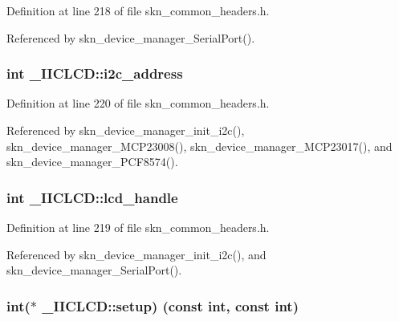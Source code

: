 Definition at line 218 of file skn\+\_\+common\+\_\+headers.\+h.



Referenced by skn\+\_\+device\+\_\+manager\+\_\+\+Serial\+Port().

\hypertarget{struct___i_i_c_l_c_d_a3f3fe8757875939b987ac0c416081551}{}
\subsubsection[{i2c\+\_\+address}]{\setlength{\rightskip}{0pt plus 5cm}int \+\_\+\+I\+I\+C\+L\+C\+D\+::i2c\+\_\+address}\label{struct___i_i_c_l_c_d_a3f3fe8757875939b987ac0c416081551}


Definition at line 220 of file skn\+\_\+common\+\_\+headers.\+h.



Referenced by skn\+\_\+device\+\_\+manager\+\_\+init\+\_\+i2c(), skn\+\_\+device\+\_\+manager\+\_\+\+M\+C\+P23008(), skn\+\_\+device\+\_\+manager\+\_\+\+M\+C\+P23017(), and skn\+\_\+device\+\_\+manager\+\_\+\+P\+C\+F8574().

\hypertarget{struct___i_i_c_l_c_d_afc74b2d9120be4a8e69e48b220d6781c}{}
\subsubsection[{lcd\+\_\+handle}]{\setlength{\rightskip}{0pt plus 5cm}int \+\_\+\+I\+I\+C\+L\+C\+D\+::lcd\+\_\+handle}\label{struct___i_i_c_l_c_d_afc74b2d9120be4a8e69e48b220d6781c}


Definition at line 219 of file skn\+\_\+common\+\_\+headers.\+h.



Referenced by skn\+\_\+device\+\_\+manager\+\_\+init\+\_\+i2c(), and skn\+\_\+device\+\_\+manager\+\_\+\+Serial\+Port().

\hypertarget{struct___i_i_c_l_c_d_ab3052517b34cbf67239b91ccbd113c00}{}
\subsubsection[{setup}]{\setlength{\rightskip}{0pt plus 5cm}int($\ast$ \+\_\+\+I\+I\+C\+L\+C\+D\+::setup) (const int, const int)}\label{struct___i_i_c_l_c_d_ab3052517b34cbf67239b91ccbd113c00}


